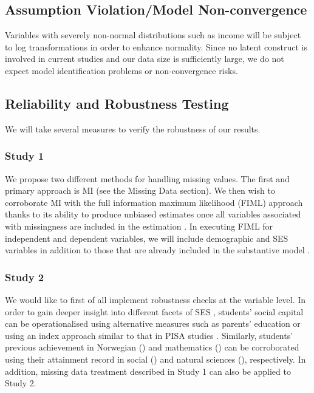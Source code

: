 \subsection{Assumption Violation/Model Non-convergence}

Variables with severely non-normal distributions such as income will be subject to log transformations in order to enhance normality. Since no latent construct is involved in current studies and our data size is sufficiently large, we do not expect model identification problems or non-convergence risks.

\subsection{Reliability and Robustness Testing}

We will take several measures to verify the robustness of our results.

\subsubsection{Study 1}

We propose two different methods for handling missing values. The first and primary approach is MI (see the Missing Data section). We then wish to corroborate MI with the full information maximum likelihood (FIML) approach \parencite{graham:2012,vanbuuren:2018} thanks to its ability to produce unbiased estimates once all variables associated with missingness are included in the estimation \parencite{graham:2012,schafer:2002}. In executing FIML for independent and dependent variables, we will include demographic and SES variables in addition to those that are already included in the substantive model \parencite[saturated correlates models, ][]{graham:2003}.

\subsubsection{Study 2}

We would like to first of all implement robustness checks at the variable level. In order to gain deeper insight into different facets of SES \parencite{apa:2017,avvisati:2020,oconnell:2019}, students' social capital can be operationalised using alternative measures such as parents' education or using an index approach similar to that in PISA studies \parencite{oecd:2019}. Similarly, students' previous achievement in Norwegian () and mathematics () can be corroborated using their attainment record in social () and natural sciences (), respectively. In addition, missing data treatment described in Study 1 can also be applied to Study 2.

